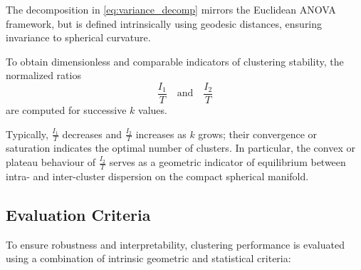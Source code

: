 \documentclass[12pt,a4paper]{report}
\begin{document}
The decomposition in \eqref{eq:variance_decomp} mirrors the Euclidean ANOVA framework, 
but is defined intrinsically using geodesic distances, ensuring invariance to spherical curvature.  

To obtain dimensionless and comparable indicators of clustering stability, the normalized ratios
\begin{equation}
\frac{I_1}{T} \quad \text{and} \quad \frac{I_2}{T}
\label{eq:normalized_ratios}
\end{equation}
are computed for successive $k$ values.  

Typically, $\frac{I_1}{T}$ decreases and $\frac{I_2}{T}$ increases as $k$ grows; 
their convergence or saturation indicates the optimal number of clusters.  
In particular, the convex or plateau behaviour of $\frac{I_2}{T}$ serves as a geometric indicator of 
equilibrium between intra- and inter-cluster dispersion on the compact spherical manifold.

\subsection{Evaluation Criteria}
To ensure robustness and interpretability, clustering performance is evaluated using a combination of intrinsic geometric and statistical criteria:
\end{document}
